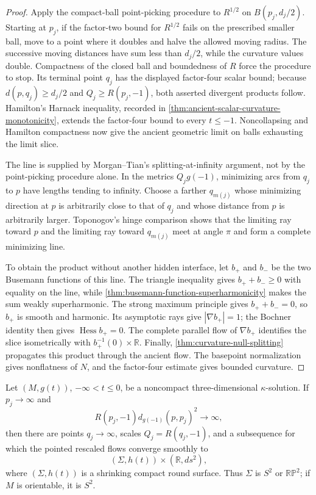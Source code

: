 \begin{proof}
Apply the compact-ball point-picking procedure to $R^{1/2}$ on
$B(p_j,d_j/2)$.  Starting at $p_j$, if the factor-two bound for $R^{1/2}$
fails on the prescribed smaller ball, move to a point where it doubles and
halve the allowed moving radius.  The successive moving distances have sum
less than $d_j/2$, while the curvature values double.  Compactness of the
closed ball and boundedness of $R$ force the procedure to stop.  Its terminal
point $q_j$ has the displayed factor-four scalar bound;
because $d(p,q_j)\ge d_j/2$ and $Q_j\ge R(p_j,-1)$, both asserted divergent
products follow.  Hamilton's Harnack inequality, recorded in
\ref{thm:ancient-scalar-curvature-monotonicity}, extends the factor-four bound
to every $t\le-1$.  Noncollapsing and Hamilton compactness now give the ancient
geometric limit on balls exhausting the limit slice.

The line is supplied by Morgan--Tian's splitting-at-infinity argument, not by
the point-picking procedure alone.  In the metrics $Q_jg(-1)$,
minimizing arcs from $q_j$ to $p$ have lengths tending to infinity.  Choose a
farther $q_{m(j)}$ whose minimizing direction at $p$ is arbitrarily close to
that of $q_j$ and whose distance from $p$ is arbitrarily larger.  Toponogov's
hinge comparison shows that the limiting ray toward $p$ and the limiting ray
toward $q_{m(j)}$ meet at angle $\pi$ and form a complete minimizing line.

To obtain the product without another hidden interface, let $b_+$ and $b_-$
be the two Busemann functions of this line.  The triangle inequality gives
$b_++b_-\ge0$ with equality on the line, while
\ref{thm:busemann-function-superharmonicity} makes the sum weakly
superharmonic.  The strong maximum principle gives $b_++b_-=0$, so $b_+$ is
smooth and harmonic.  Its asymptotic rays give $|\nabla b_+|=1$; the Bochner
identity then gives $\operatorname{Hess}b_+=0$.  The complete parallel flow of
$\nabla b_+$ identifies the slice isometrically with
$b_+^{-1}(0)\times\mathbb R$.  Finally,
\ref{thm:curvature-null-splitting} propagates this product through the ancient
flow.  The basepoint normalization gives nonflatness of $N$, and the
factor-four estimate gives bounded curvature.
\end{proof}

\begin{theorem}
\label{thm:kappa-solution-splitting-at-infinity}
\notready
Let $(M,g(t))$, $-\infty<t\le0$, be a noncompact three-dimensional
$\kappa$-solution.  If $p_j\to\infty$ and
\[
 R(p_j,-1)d_{g(-1)}(p,p_j)^2\longrightarrow\infty,
\]
then there are points $q_j\to\infty$, scales $Q_j=R(q_j,-1)$, and a
subsequence for which the pointed rescaled flows converge smoothly to
\[
 (\Sigma,h(t))\times(\mathbb R,ds^2),
\]
where $(\Sigma,h(t))$ is a shrinking compact round surface.  Thus
$\Sigma$ is $S^2$ or $\mathbb{RP}^2$; if $M$ is orientable, it is $S^2$.
\end{theorem}

